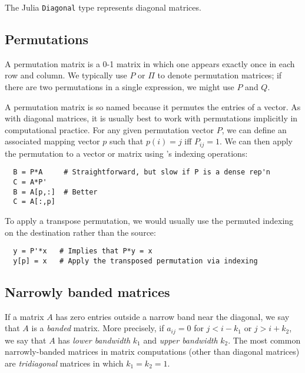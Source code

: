 \documentclass[12pt, leqno]{article} %
\begin{document}
The Julia {\tt Diagonal} type represents diagonal matrices.

\subsection{Permutations}

A permutation matrix is a 0-1 matrix in which one appears exactly
once in each row and column.  We typically use $P$ or $\Pi$ to
denote permutation matrices; if there are two permutations in a
single expression, we might use $P$ and $Q$.

A permutation matrix is so named because it permutes the entries
of a vector.  As with diagonal matrices, it is usually best to
work with permutations implicitly in computational practice.
For any given permutation vector $P$, we can define an associated
mapping vector $p$ such that $p(i) = j$ iff $P_{ij} = 1$.  We can
then apply the permutation to a vector or matrix using \matlab's
indexing operations:
\begin{lstlisting}
  B = P*A     # Straightforward, but slow if P is a dense rep'n
  C = A*P' 
  B = A[p,:]  # Better
  C = A[:,p] 
\end{lstlisting}
To apply a transpose permutation, we would usually use the permuted
indexing on the destination rather than the source:
\begin{lstlisting}
  y = P'*x   # Implies that P*y = x
  y[p] = x   # Apply the transposed permutation via indexing
\end{lstlisting}

\subsection{Narrowly banded matrices}

If a matrix $A$ has zero entries outside a narrow band near the
diagonal, we say that $A$ is a {\em banded} matrix.  More precisely,
if $a_{ij} = 0$ for $j < i-k_1$ or $j > i+k_2$, we say that $A$
has {\em lower bandwidth} $k_1$ and {\em upper bandwidth} $k_2$.
The most common narrowly-banded matrices in matrix computations
(other than diagonal matrices) are {\em tridiagonal} matrices in
which $k_1 = k_2 = 1$.
\end{document}
